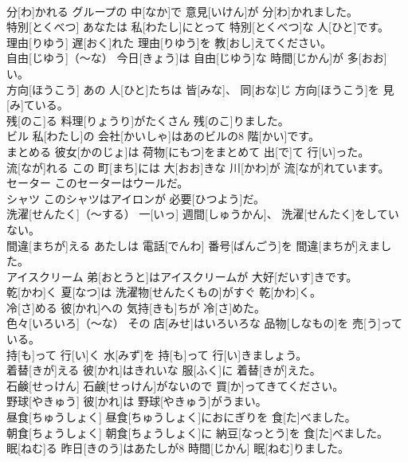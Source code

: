 \documentclass[8pt]{extreport}
\begin{document}
\begin{CJK}{UTF8}{min}
\\	分[わ]かれる	グループの 中[なか]で 意見[いけん]が 分[わ]かれました。		
\\	特別[とくべつ]	あなたは 私[わたし]にとって 特別[とくべつ]な 人[ひと]です。		
\\	理由[りゆう]	遅[おく]れた 理由[りゆう]を 教[おし]えてください。		
\\	自由[じゆう]（～な）	今日[きょう]は 自由[じゆう]な 時間[じかん]が 多[おお]い。		
\\	方向[ほうこう]	あの 人[ひと]たちは 皆[みな]、 同[おな]じ 方向[ほうこう]を 見[み]ている。		
\\	残[のこ]る	料理[りょうり]がたくさん 残[のこ]りました。		
\\	ビル	私[わたし]の 会社[かいしゃ]はあのビルの8 階[かい]です。		
\\	まとめる	彼女[かのじょ]は 荷物[にもつ]をまとめて 出[で]て 行[い]った。		
\\	流[なが]れる	この 町[まち]には 大[おお]きな 川[かわ]が 流[なが]れています。		
\\	セーター	このセーターはウールだ。		
\\	シャツ	このシャツはアイロンが 必要[ひつよう]だ。		
\\	洗濯[せんたく]（～する）	一[いっ] 週間[しゅうかん]、 洗濯[せんたく]をしていない。		
\\	間違[まちが]える	あたしは 電話[でんわ] 番号[ばんごう]を 間違[まちが]えました。		
\\	アイスクリーム	弟[おとうと]はアイスクリームが 大好[だいす]きです。		
\\	乾[かわ]く	夏[なつ]は 洗濯物[せんたくもの]がすぐ 乾[かわ]く。		
\\	冷[さ]める	彼[かれ]への 気持[きも]ちが 冷[さ]めた。		
\\	色々[いろいろ]（～な）	その 店[みせ]はいろいろな 品物[しなもの]を 売[う]っている。		
\\	持[も]って 行[い]く	水[みず]を 持[も]って 行[い]きましょう。		
\\	着替[きが]える	彼[かれ]はきれいな 服[ふく]に 着替[きが]えた。		
\\	石鹸[せっけん]	石鹸[せっけん]がないので 買[か]ってきてください。		
\\	野球[やきゅう]	彼[かれ]は 野球[やきゅう]がうまい。		
\\	昼食[ちゅうしょく]	昼食[ちゅうしょく]におにぎりを 食[た]べました。		
\\	朝食[ちょうしょく]	朝食[ちょうしょく]に 納豆[なっとう]を 食[た]べました。		
\\	眠[ねむ]る	昨日[きのう]はあたしが8 時間[じかん] 眠[ねむ]りました。		

\end{CJK}
\end{document}
